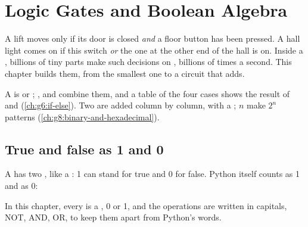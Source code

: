 \chapter{Logic Gates and Boolean Algebra}\label{ch:g9:logic-gates}

A lift moves only if its door is closed \emph{and} a floor button has been
pressed. A hall light comes on if this switch \emph{or} the one at the other
end of the hall is on. Inside a , billions of tiny parts make such
decisions on , billions of times a second. This chapter builds them, from
the smallest one to a circuit that adds.

\begin{recall}
A  is  or ; ,  and
 combine them, and a table of the four cases shows the result of
 and  (\cref{ch:g6:if-else}). Two  are added column by
column, with a ; $n$  make $2^n$ patterns
(\cref{ch:g8:binary-and-hexadecimal}).
\end{recall}

\section{True and false as 1 and 0}

A  has two , like a : 1 can stand for true and 0 for
false. Python itself counts  as 1 and  as 0:

\label{lst:g9:logic-gates:bits}

\label{out:g9:logic-gates:bits}

In this chapter, every  is a , 0 or 1, and the operations are written
in capitals, NOT, AND, OR, to keep them apart from Python's words.

